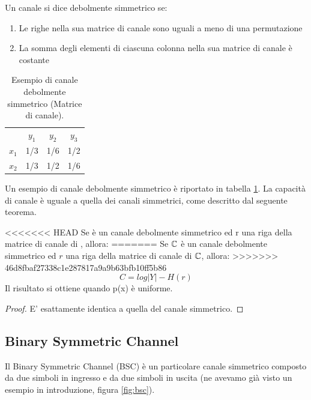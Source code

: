 \medskip

\begin{definizione}
 Un canale si dice debolmente simmetrico se:
 \begin{enumerate}
  \item Le righe nella sua matrice di canale sono uguali a meno di una permutazione
  \item La somma degli elementi di ciascuna colonna nella sua matrice di canale è costante
 \end{enumerate}
\end{definizione}

\begin{table}[htbp]
  \begin{center}
   \begin{tabular}{c c c c}
	  & $y_1$ & $y_2$ & $y_3$ \\
	$x_1$ & 1/3 & 1/6 & 1/2 \\ 
	$x_2$ & 1/3 & 1/2 & 1/6  \\ 
    \end{tabular}
  \end{center}
  \label{tdsim}
  \caption{Esempio di canale debolmente simmetrico (Matrice di canale).}
\end{table}

\noindent
Un esempio di canale debolmente simmetrico è riportato in tabella \ref{tdsim}.
La capacità di canale è uguale a quella dei canali simmetrici, come descritto dal seguente teorema.

\begin{teorema}
<<<<<<< HEAD
 Se  è un canale debolmente simmetrico ed r una riga della matrice di canale di , allora:
=======
 Se $\mathbb{C}$ è un canale debolmente simmetrico ed $r$ una riga della matrice di canale di $\mathbb{C}$, allora:
>>>>>>> 46d8fbaf27338c1e287817a9a9b63bfb10ff5b86
 \[
  C=log|Y| - H(r)
 \]
 Il risultato si ottiene quando p(x) è uniforme.
\begin{proof}
 E' esattamente identica a quella del canale simmetrico.
\end{proof}

\end{teorema}

\subsection{Binary Symmetric Channel}

Il Binary Symmetric Channel (BSC) è un particolare canale simmetrico composto da due simboli in ingresso e da due simboli in uscita (ne avevamo già visto un esempio in introduzione, figura \ref{fig:bsc}).

